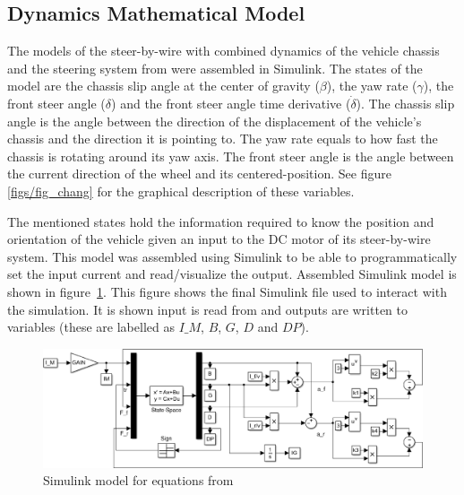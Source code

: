 \documentclass[twocolumn,10pt]{asme2e}
\begin{document}
\subsection*{Dynamics Mathematical Model}
The models of the steer-by-wire with combined dynamics of the vehicle
chassis and the steering system from \cite{chang} were assembled in
Simulink. The states of the model are the chassis slip angle at the
center of gravity ($\beta$), the yaw rate ($\gamma$), the front steer angle ($\delta$)
and the front steer angle time derivative ($\dot{\delta}$). The chassis
slip angle is the angle between the direction of the displacement of the vehicle's
chassis and the direction it is pointing to. The yaw rate equals to how fast
the chassis is rotating around its yaw axis. The front steer angle is the angle
between the current direction of the wheel and its centered-position.
See figure \ref{figs/fig_chang} for the graphical description of these variables.

The mentioned states hold the information required to know the position and orientation
of the vehicle given an input to the DC motor of its steer-by-wire system. This model was
assembled using Simulink to be able to programmatically set the input current and read/visualize
the output. Assembled Simulink model is shown in figure~\ref{figs/fig_simulink}.
This figure shows the final Simulink file used to interact with the simulation. It is shown
input is read from and outputs are written to variables (these are labelled as $I\_M$, $B$, $G$, $D$ and
$DP$).

\begin{figure}
\begin{center}
\includegraphics[width=14cm]{figs/fig_simulink.eps}
\caption{Simulink model for equations from \cite{chang}}
\label{figs/fig_simulink}
\end{center}
\end{figure}
\end{document}
